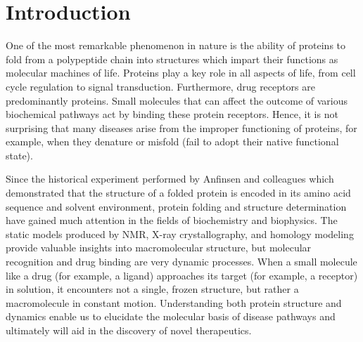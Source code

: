 \chapter{Introduction}



One of the most remarkable phenomenon in nature is the ability of proteins to fold from a polypeptide chain into structures which impart their functions as molecular machines of life. Proteins play a key role in all aspects of life, from cell cycle regulation to signal transduction.  Furthermore, drug receptors are predominantly proteins.  Small molecules that can affect the outcome of various biochemical pathways act by binding these protein receptors. Hence, it is not surprising that many diseases arise from the improper functioning of proteins, for example, when they denature or misfold (fail to adopt their native functional state).

Since the historical experiment performed by Anfinsen and colleagues which demonstrated that the structure of a folded protein is encoded in its amino acid sequence and solvent environment, protein folding and structure determination have gained much attention in the fields of biochemistry and biophysics.  The static models produced by NMR, X-ray crystallography, and homology modeling provide valuable insights into macromolecular structure, but molecular recognition and drug binding are very dynamic processes.  When a small molecule like a drug (for example, a ligand) approaches its target (for example, a receptor) in solution, it encounters not a single, frozen structure, but rather a macromolecule in constant motion. Understanding both protein structure and dynamics enable us to elucidate the molecular basis of disease pathways and ultimately will aid in the discovery of novel therapeutics. 

